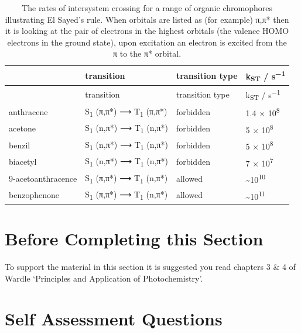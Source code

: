 \documentclass[
]{book}
\begin{document}
\begin{longtable}[]{@{}llll@{}}
\caption{\label{tab:rateST} The rates of intersystem crossing for a range of organic chromophores illustrating El Sayed's rule. When orbitals are listed as (for example) π,π* then it is looking at the pair of electrons in the highest orbitals (the valence HOMO electrons in the ground state), upon excitation an electron is excited from the π to the π* orbital.}\tabularnewline
\toprule
& transition & transition type & k\textsubscript{ST} / s\textsuperscript{−1}\tabularnewline
\midrule
\endfirsthead
\toprule
& transition & transition type & k\textsubscript{ST} / s\textsuperscript{−1}\tabularnewline
\midrule
\endhead
anthracene & S\textsubscript{1} (π,π*) ⟶ T\textsubscript{1} (π,π*) & forbidden & 1.4 × 10\textsuperscript{8}\tabularnewline
acetone & S\textsubscript{1} (n,π*) ⟶ T\textsubscript{1} (n,π*) & forbidden & 5 × 10\textsuperscript{8}\tabularnewline
benzil & S\textsubscript{1} (n,π*) ⟶ T\textsubscript{1} (n,π*) & forbidden & 5 × 10\textsuperscript{8}\tabularnewline
biacetyl & S\textsubscript{1} (n,π*) ⟶ T\textsubscript{1} (n,π*) & forbidden & 7 × 10\textsuperscript{7}\tabularnewline
9-acetoanthracence & S\textsubscript{1} (π,π*) ⟶ T\textsubscript{1} (n,π*) & allowed & \textasciitilde10\textsuperscript{10}\tabularnewline
benzophenone & S\textsubscript{1} (π,π*) ⟶ T\textsubscript{1} (n,π*) & allowed & \textasciitilde10\textsuperscript{11}\tabularnewline
\bottomrule
\end{longtable}

\hypertarget{sec:beforeem}{%
\section{Before Completing this Section}\label{sec:beforeem}}

To support the material in this section it is suggested you read chapters 3 \& 4 of Wardle `Principles and Application of Photochemistry'.

\hypertarget{sec:SSQemission}{%
\section{Self Assessment Questions}\label{sec:SSQemission}}
\end{document}
